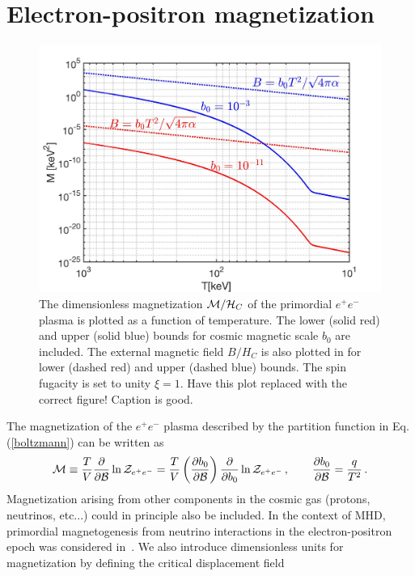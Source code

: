 \documentclass[a4paper]{article}
\newcommand{\req}[1]{Eq.\,(\ref{#1})}
\newcommand*{\xred}{\color{red}}
\begin{document}
\section{Electron-positron magnetization}
\label{sec:magnetization}
\begin{figure}[ht]
    \centering
    \includegraphics[width=\textwidth]{Magnetization_paper.jpg}
    \caption{The dimensionless magnetization ${\cal M}/{\cal H}_{C}$ of the primordial $e^{+}e^{-}$ plasma is plotted as a function of temperature. The lower (solid red) and upper (solid blue) bounds for cosmic magnetic scale $b_{0}$ are included. The external magnetic field $B/H_{C}$ is also plotted in for lower (dashed red) and upper (dashed blue) bounds. The spin fugacity is set to unity $\xi=1$. {\xred Have this plot replaced with the correct figure! Caption is good.}}
    \label{magnetization} 
\end{figure}
\noindent The magnetization of the $e^{+}e^{-}$ plasma described by the partition function in \req{boltzmann} can be written as
\begin{align}
    \label{defmagetization}
    {\cal M}\equiv\frac{T}{V}\frac{\partial}{\partial{\cal B}}\ln{{\cal Z}_{e^{+}e^{-}}} = \frac{T}{V}\left(\frac{\partial b_{0}}{\partial{\cal B}}\right)\frac{\partial}{\partial b_{0}}\ln{{\cal Z}_{e^{+}e^{-}}}\,,\qquad\frac{\partial b_{0}}{\partial{\cal B}}=\frac{q}{T^{2}}\,.
\end{align}
Magnetization arising from other components in the cosmic gas (protons, neutrinos, etc...) could in principle also be included. In the context of MHD, primordial magnetogenesis from neutrino interactions in the electron-positron epoch was considered in~\cite{perrone2021neutrinoelectron}. We also introduce dimensionless units for magnetization by defining the critical displacement field
\end{document}
